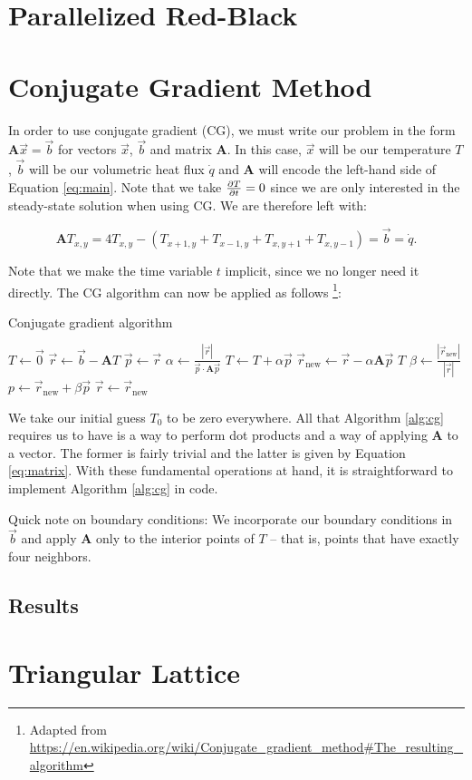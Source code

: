 \documentclass[paper=a4, fontsize=11pt]{scrartcl} %
\numberwithin{equation}{section} %
\numberwithin{figure}{section} %
\numberwithin{table}{section} %
\newcommand{\matr}[1]{\mathbf{#1}}
\begin{document}
\section{Parallelized Red-Black}


\section{Conjugate Gradient Method}

In order to use conjugate gradient (CG), we must write our problem in the form $\matr{A}\vec{x} = \vec{b}$ for vectors $\vec{x}$, $\vec{b}$ and matrix $\matr{A}$. In this case, $\vec{x}$ will be our temperature $T$, $\vec{b}$ will be our volumetric heat flux $\dot{q}$ and $\matr{A}$ will encode the left-hand side of Equation \ref{eq:main}. Note that we take ${\partial T \over \partial t} = 0$ since we are only interested in the steady-state solution when using CG. We are therefore left with:

\begin{equation}
	\matr{A}T_{x,y} = 4T_{x,y} - (T_{x+1,y} + T_{x-1,y} + T_{x,y+1} + T_{x,y-1}) = \vec{b} = \dot{q}.
	\label{eq:matrix}
\end{equation}

Note that we make the time variable $t$ implicit, since we no longer need it directly. The CG algorithm can now be applied as follows \footnote{Adapted from \url{https://en.wikipedia.org/wiki/Conjugate_gradient_method#The_resulting_algorithm}}:

\begin{algorithm}[H]
\caption{Conjugate gradient algorithm}
\begin{algorithmic}
	\REQUIRE{$\matr{A}$, $\vec{b}$, $\epsilon$}
	\STATE $T \gets \vec{0}$
	\STATE $\vec{r} \gets \vec{b} - \matr{A}T$  
	\STATE $\vec{p} \gets \vec{r}$
	\LOOP
		\STATE $\alpha \gets \frac{|\vec{r}|}{\vec{p} \cdot \matr{A}\vec{p}}$
		\STATE $T \gets T + \alpha \vec{p}$
		\STATE $\vec{r}_{\mathrm{new}} \gets \vec{r} - \alpha\matr{A}\vec{p}$
			\RETURN $T$
		\ENDIF
		\STATE $\beta \gets \frac{|\vec{r}_{\mathrm{new}}|}{|\vec{r}|}$
		\STATE $p \gets \vec{r}_{\mathrm{new}} + \beta\vec{p}$
		\STATE $\vec{r} \gets \vec{r}_{\mathrm{new}}$
	\ENDLOOP
\end{algorithmic}
\label{alg:cg}
\end{algorithm}

We take our initial guess $T_0$ to be zero everywhere. All that Algorithm \ref{alg:cg} requires us to have is a way to perform dot products and a way of applying $\matr{A}$ to a vector. The former is fairly trivial and the latter is given by Equation \ref{eq:matrix}. With these fundamental operations at hand, it is straightforward to implement Algorithm \ref{alg:cg} in code. \linebreak

Quick note on boundary conditions: We incorporate our boundary conditions in $\vec{b}$ and apply $\matr{A}$ only to the interior points of $T$ -- that is, points that have exactly four neighbors.

\subsection{Results}



\section{Triangular Lattice}
\end{document}
